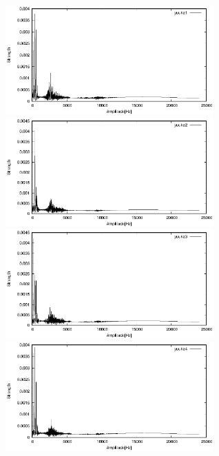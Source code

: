 \documentclass[titlepage]{jarticle}
\begin{document}
\begin{figure}[H]
  \begin{minipage}{0.495\hsize}
    \centering
    \includegraphics[width=8cm]{img/yuuka1.eps}
    \caption{}
    \label{yuuka1}
  \end{minipage}
  \begin{minipage}{0.495\hsize}
    \centering
    \includegraphics[width=8cm]{img/yuuka2.eps}
    \caption{}
    \label{yuuka2}
  \end{minipage}


  \begin{minipage}{0.495\hsize}
    \centering
    \includegraphics[width=8cm]{img/yuuka3.eps}
    \caption{}
    \label{yuuka3}
  \end{minipage}
  \begin{minipage}{0.495\hsize}
    \centering
    \includegraphics[width=8cm]{img/yuuka4.eps}
    \caption{}
    \label{yuuka4}
  \end{minipage}
\end{figure}
\end{document}
